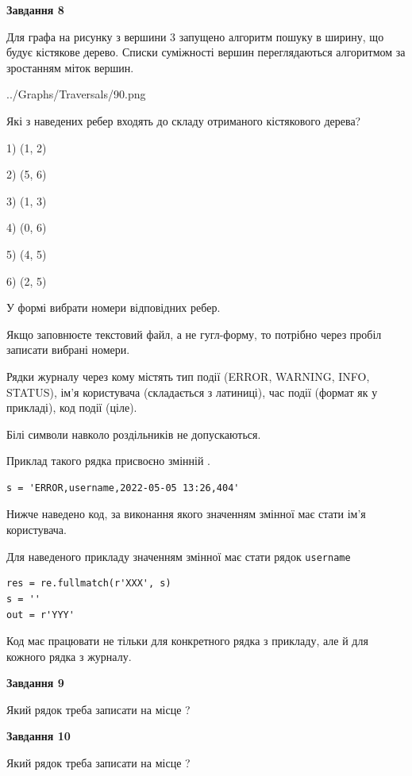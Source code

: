 \documentclass[12pt, ukrainian]{article}
\def\code#1{\Verb!#1!}
\begin{document}
{\begin {large}
{\begin {center}\textbf{Завдання 8}\end {center}}\par
Для графа на рисунку з вершини 3 запущено алгоритм пошуку в ширину, що будує кістякове дерево. Списки суміжності вершин переглядаються алгоритмом за зростанням міток вершин.\par
\begin{center}
	{../Graphs/Traversals/90.png}
\end{center}
\par Які з наведених ребер входять до складу отриманого кістякового дерева?\par
1) (1, 2)\par
2) (5, 6)\par
3) (1, 3)\par
4) (0, 6)\par
5) (4, 5)\par
6) (2, 5)\par
{\vskip 15pt} У формі вибрати номери відповідних ребер.


Якщо заповнюєте текстовий файл, а не гугл-форму, то потрібно через пробіл записа\-ти вибрані номери.\par
\newpage


Рядки журналу через кому містять тип події (ERROR, WARNING, INFO, STATUS), ім'я користувача (складається з латиниці), час події (фор\-мат як у прикладі), код події (ціле).

Білі символи навколо роздільників не допускаються.

Приклад такого рядка присвоєно змінній .



\begin{verbatim}
s = 'ERROR,username,2022-05-05 13:26,404'
\end{verbatim}


Нижче наведено код, за виконання якого значенням змінної  має стати ім'я користувача.

Для наведеного прикладу значенням змінної  має стати рядок \code{username}



\begin{verbatim}
res = re.fullmatch(r'XXX', s)
s = ''
out = r'YYY'
\end{verbatim}


Код має працювати не тільки для конкретного рядка з прикладу, але й для кожного рядка з журналу.

{\begin {center}\textbf{Завдання 9}\end {center}}\par
Який рядок треба записати на місце  ?\par
\vspace{5mm}


{\begin {center}\textbf{Завдання 10}\end {center}}\par
Який рядок треба записати на місце  ?\par


\newpage


\end {large}}
\end{document}
